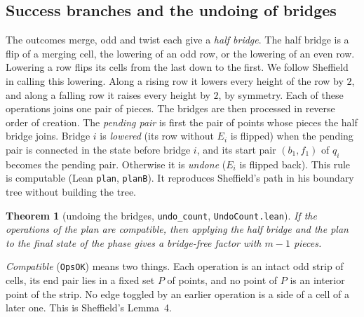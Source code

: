 \documentclass[11pt]{article}
\theoremstyle{plain}
\newtheorem{theorem}{Theorem}[section]
\theoremstyle{definition}
\theoremstyle{remark}
\newcommand{\lean}[1]{\texttt{#1}}
\begin{document}
\subsection{Success branches and the undoing of bridges}
\label{sec:undo}

The outcomes merge, odd and twist each give a \emph{half bridge}.
The half bridge is a flip of a merging cell, the lowering of an odd row, or the lowering of an
even row.
Lowering a row flips its cells from the last down to the first.
We follow Sheffield in calling this lowering.
Along a rising row it lowers every height of the row by $2$, and along a falling row it raises every
height by $2$, by symmetry.
Each of these operations joins one pair of pieces.
The bridges are then processed in reverse order of creation.
The \emph{pending pair} is first the pair of points whose pieces the half bridge joins.
Bridge $i$ is \emph{lowered} (its row without $E_i$ is flipped) when the pending pair is connected
in the state before bridge $i$, and its start pair $(b_1,f_1)$ of $q_i$ becomes the pending pair.
Otherwise it is \emph{undone} ($E_i$ is flipped back).
This rule is computable (Lean \lean{plan}, \lean{planB}).
It reproduces Sheffield's path in his boundary tree without building the tree.

\begin{theorem}[undoing the bridges, \lean{undo\_count}, \lean{UndoCount.lean}]
\label{thm:undo}
If the operations of the plan are compatible, then applying the half bridge and the plan to the
final state of the phase gives a bridge-free factor with $m-1$ pieces.
\end{theorem}

\emph{Compatible} (\lean{OpsOK}) means two things.
Each operation is an intact odd strip of cells, its end pair lies in a fixed set $P$ of points, and
no point of $P$ is an interior point of the strip.
No edge toggled by an earlier operation is a side of a cell of a later one.
This is Sheffield's Lemma~4.
\end{document}
